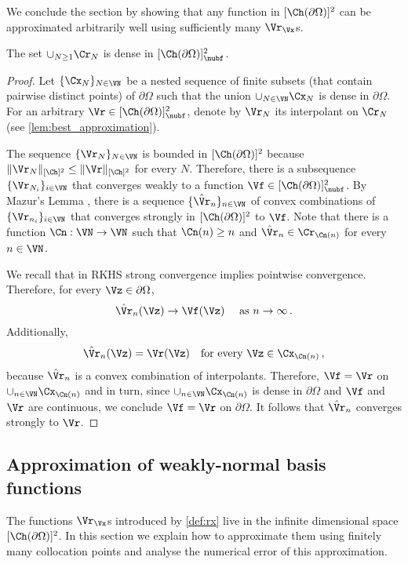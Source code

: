 \documentclass{siamart1116}
\numberwithin{theorem}{section}
\begin{document}
We conclude the section by showing that any function in $[\Ch(\partial \Omega)]^2$
can be approximated arbitrarily well using sufficiently many $\Vr_\Vx$s.
\begin{theorem}\label{thm:rxaredensesubset}
	The set	$\cup_{N\ge 1}\Cr_N$ is dense in
	$[\Ch(\partial \Omega)]^2_{\nubf}$.
\end{theorem}
\begin{proof}
Let $\{\Cx_N\}_{N\in\VN}$ be a nested sequence of
finite subsets (that contain pairwise distinct points) of $\partial \Omega$
such that the union $\cup_{N\in\VN}\Cx_N$ is dense in $\partial \Omega$.
For an arbitrary $\Vr\in [\Ch(\partial \Omega)]^2_{\nubf}$, denote
by $\Vr_N$ its interpolant on $\Cr_N$
(see \cref{lem:best_approximation}).

The sequence $\{\Vr_N\}_{N\in\VN}$ is bounded in $[\Ch(\partial \Omega)]^2$ because
$\Vert \Vr_N \Vert_{[\Ch]^2} \leq \Vert \Vr\Vert_{[\Ch]^2}$ for every $N$.
Therefore, there is a subsequence $\{\Vr_{N_i}\}_{i\in\VN}$
that converges  weakly to a function $\Vf\in [\Ch(\partial \Omega)]^2_{\nubf}$.
By Mazur's Lemma \cite[p.61]{TemanEkeland99}, there is a sequence $\{\hat\Vr_{n}\}_{n\in\VN}$
of convex combinations of $\{\Vr_{n_i}\}_{i\in\VN}$ that converges
strongly in $[\Ch(\partial \Omega)]^2$ to $\Vf$.
Note that there is a function $\Cn:\VN \to \VN$ such that $\Cn(n)\ge n$ and  $\hat\Vr_{n} \in  
\Cr_{\Cn(n)}$ for every $n\in\VN$.

We recall that in RKHS strong convergence implies pointwise convergence. Therefore,
for every $\Vz\in\partial \Omega$,
\begin{equation}\label{eq:conv_pointwise}
\hat \Vr_{n}(\Vz) \to \Vf(\Vz) \quad \text{ as } n\to \infty\,.
\end{equation}
Additionally,
\begin{equation}
\hat\Vr_{n}(\Vz) = \Vr(\Vz) \quad \text{for every } \Vz\in \Cx_{\Cn(n)}\,,
\end{equation}
because $\hat\Vr_{n}$ is a convex combination of interpolants. Therefore, 
$\Vf = \Vr$ on $\cup_{n\in\VN}\Cx_{\Cn(n)}$ and in turn, since $\cup_{n\in\VN}\Cx_{\Cn(n)}$ is dense in $\partial\Omega$ and $\Vf$ and $\Vr$ are continuous, we conclude $\Vf = \Vr$ on $\partial \Omega$. 
It follows that  $\hat \Vr_{n}$ converges strongly to $\Vr$.
\end{proof}
\subsection{Approximation of weakly-normal basis functions}
The functions $\Vr_\Vx$s introduced by \cref{def:rx} live in the infinite dimensional space
$[\Ch(\partial \Omega)]^2$. In this section we explain how to approximate them using
finitely many collocation points and analyse the numerical error of this approximation.
\end{document}
